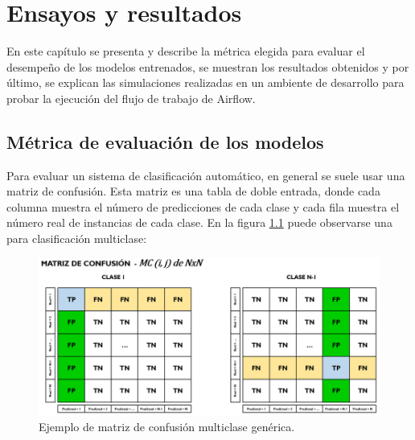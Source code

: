 
\chapter{Ensayos y resultados} %

\label{Chapter4} %

En este capítulo se presenta y describe la métrica elegida para evaluar el desempeño de los modelos entrenados, se muestran los resultados obtenidos y por último, se explican las simulaciones realizadas en un ambiente de desarrollo para probar la ejecución del flujo de trabajo de Airflow.

\section{Métrica de evaluación de los modelos}

Para evaluar un sistema de clasificación automático, en general se suele usar una matriz de confusión. Esta matriz es una tabla de doble entrada, donde cada columna muestra el número de predicciones de cada clase y cada fila muestra el número real de instancias de cada clase. En la figura \ref{fig:matriz-confusion} puede observarse una para clasificación multiclase:

\begin{figure}[htbp]
	\centering
	\includegraphics[width=1\textwidth]{./Figures/matriz-confusion.png}
	\caption{Ejemplo de matriz de confusión multiclase genérica\protect\footnotemark.}
	\label{fig:matriz-confusion}
\end{figure}


